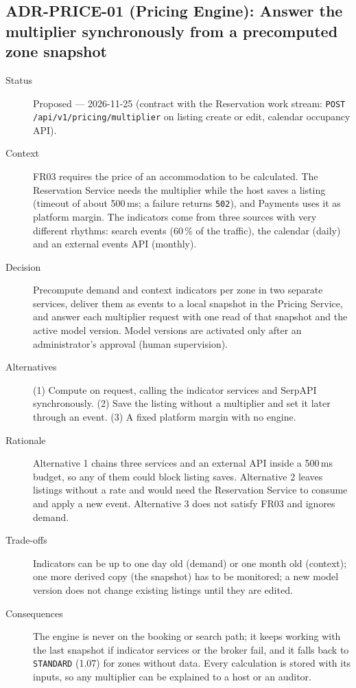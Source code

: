 \subsection{ADR-PRICE-01 (Pricing Engine): Answer the multiplier synchronously from a precomputed zone snapshot}
\begin{description}
  \item[Status] Proposed --- 2026-11-25 (contract with the Reservation work
    stream: \texttt{POST /api/v1/pricing/multiplier} on listing create or
    edit, calendar occupancy API).
  \item[Context] FR03 requires the price of an accommodation to be
    calculated. The Reservation Service needs the multiplier while the host
    saves a listing (timeout of about 500\,ms; a failure returns
    \texttt{502}), and Payments uses it as platform margin. The indicators
    come from three sources with very different rhythms: search events
    (60\,\% of the traffic), the calendar (daily) and an external events API
    (monthly).
  \item[Decision] Precompute demand and context indicators per zone in two
    separate services, deliver them as events to a local snapshot in the
    Pricing Service, and answer each multiplier request with one read of that
    snapshot and the active model version. Model versions are activated only
    after an administrator's approval (human supervision).
  \item[Alternatives] (1) Compute on request, calling the indicator services
    and SerpAPI synchronously. (2) Save the listing without a multiplier and
    set it later through an event. (3) A fixed platform margin with no
    engine.
  \item[Rationale] Alternative 1 chains three services and an external API
    inside a 500\,ms budget, so any of them could block listing saves.
    Alternative 2 leaves listings without a rate and would need the
    Reservation Service to consume and apply a new event. Alternative 3 does
    not satisfy FR03 and ignores demand.
  \item[Trade-offs] Indicators can be up to one day old (demand) or one
    month old (context); one more derived copy (the snapshot) has to be
    monitored; a new model version does not change existing listings until
    they are edited.
  \item[Consequences] The engine is never on the booking or search path; it
    keeps working with the last snapshot if indicator services or the broker
    fail, and it falls back to \texttt{STANDARD} (1.07) for zones without
    data. Every calculation is stored with its inputs, so any multiplier can
    be explained to a host or an auditor.
\end{description}

